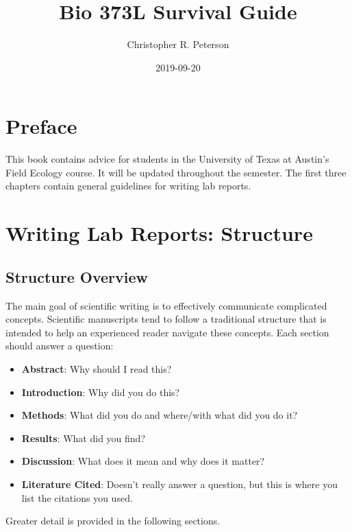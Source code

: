 \documentclass[]{book}
\title{Bio 373L Survival Guide}
\author{Christopher R. Peterson}
\date{2019-09-20}
\providecommand{\tightlist}{%
  \setlength{\itemsep}{0pt}\setlength{\parskip}{0pt}}
\begin{document}
\maketitle

{
\setcounter{tocdepth}{1}
\tableofcontents
}
\chapter*{Preface}\label{preface}

This book contains advice for students in the University of Texas at
Austin's Field Ecology course. It will be updated throughout the
semester. The first three chapters contain general guidelines for
writing lab reports.

\chapter{Writing Lab Reports: Structure}\label{structure}

\section{Structure Overview}\label{structure-overview}

The main goal of scientific writing is to effectively communicate
complicated concepts. Scientific manuscripts tend to follow a
traditional structure that is intended to help an experienced reader
navigate these concepts. Each section should answer a question:

\begin{itemize}
\tightlist
\item
  \textbf{Abstract}: Why should I read this?
\item
  \textbf{Introduction}: Why did you do this?\\
\item
  \textbf{Methods}: What did you do and where/with what did you do it?
\item
  \textbf{Results}: What did you find?\\
\item
  \textbf{Discussion}: What does it mean and why does it matter?
\item
  \textbf{Literature Cited}: Doesn't really answer a question, but this
  is where you list the citations you used.
\end{itemize}

Greater detail is provided in the following sections.
\end{document}
